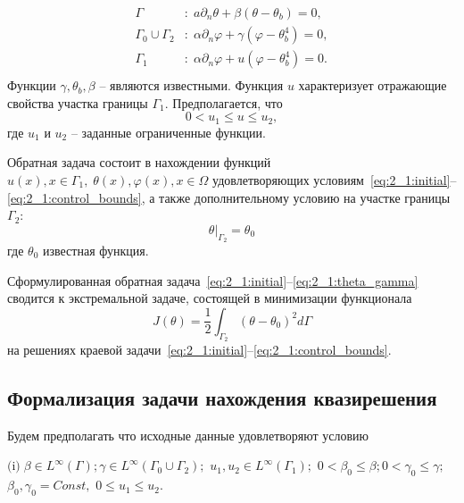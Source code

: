 \begin{equation}
    \label{eq:2_1:initial-boundary}
    \begin{aligned}
        \Gamma &: \; a \partial_n \theta + \beta (\theta - \theta _b) = 0, \\
        \Gamma_0 \cup \Gamma_2 &: \; \alpha \partial_n \varphi
        + \gamma(\varphi - \theta_b ^4 ) = 0, \\
        \Gamma_1 &: \; \alpha \partial_n \varphi + u(\varphi - \theta_b ^4 ) = 0. \\
    \end{aligned}
\end{equation}
Функции $\gamma, \theta_b, \beta$ -- являются известными.
Функция $u$ характеризует отражающие свойства участка границы $\Gamma_1$.
Предполагается, что
\begin{equation}
    \label{eq:2_1:control_bounds}
    0 < u_1 \leq u \leq u_2,
\end{equation}
где $u_1$ и $u_2$ -- заданные ограниченные функции.


Обратная задача состоит в нахождении функций $u(x), x \in  \Gamma_1, \; \theta(x), \varphi(x), x \in \Omega $
удовлетворяющих условиям~\eqref{eq:2_1:initial}--\eqref{eq:2_1:control_bounds},
а также дополнительному условию на участке границы $\Gamma_2$:
\begin{equation}
    \label{eq:2_1:theta_gamma}
    \theta|_{\Gamma_2}=\theta_0
\end{equation}
где $\theta_0$ известная функция.


Сформулированная обратная задача~\eqref{eq:2_1:initial}--\eqref{eq:2_1:theta_gamma}
сводится к экстремальной задаче,
состоящей в минимизации функционала
\begin{equation}
    \label{eq:2_1:quality}
    J(\theta) = \frac{1}{2} \int_{\Gamma_2} (\theta - \theta_0)^2 d\Gamma
\end{equation}
на решениях краевой задачи~\eqref{eq:2_1:initial}--\eqref{eq:2_1:control_bounds}.

\subsection{Формализация задачи нахождения квазирешения}\label{subsec:ch2/sec1/subsec2}


Будем предполагать что исходные данные удовлетворяют условию

$\text{(i)}\;    \beta\in L^\infty(\Gamma); \gamma \in L^\infty(\Gamma_0\cup\Gamma_2);$
$u_1, u_2 \in L^\infty(\Gamma_1);$
$0 < \beta_0 \le \beta; 0 < \gamma_0 \le \gamma;$$\beta_0,\gamma_0=Const,$
$0 \le u_1 \le u_2.$

